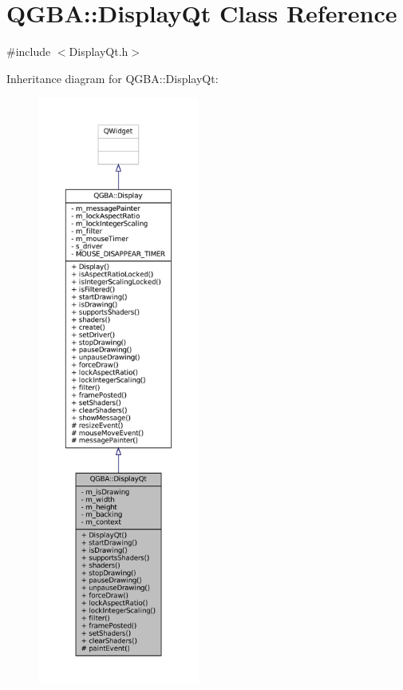 \hypertarget{class_q_g_b_a_1_1_display_qt}{}\section{Q\+G\+BA\+:\+:Display\+Qt Class Reference}
\label{class_q_g_b_a_1_1_display_qt}


{\ttfamily \#include $<$Display\+Qt.\+h$>$}



Inheritance diagram for Q\+G\+BA\+:\+:Display\+Qt\+:
\nopagebreak
\begin{figure}[H]
\begin{center}
\leavevmode
\includegraphics[height=550pt]{class_q_g_b_a_1_1_display_qt__inherit__graph}
\end{center}
\end{figure}


